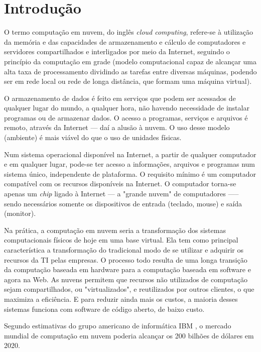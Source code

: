 \section{Introdução}

O termo computação em nuvem, do inglês \emph{cloud computing}, refere-se à
utilização da memória e das capacidades de armazenamento e cálculo de
computadores e servidores compartilhados e interligados por meio da Internet,
seguindo o princípio da computação em grade (modelo computacional capaz de
alcançar uma alta taxa de processamento dividindo as tarefas entre diversas
máquinas, podendo ser em rede local ou rede de longa distância, que formam uma
máquina virtual).

O armazenamento de dados é feito em serviços que podem ser acessados de qualquer
lugar do mundo, a qualquer hora, não havendo necessidade de instalar
programas ou de armazenar dados. O acesso a programas, serviços e arquivos é
remoto, através da Internet --- daí a alusão à nuvem. O uso desse modelo
(ambiente) é mais viável do que o uso de unidades físicas.

Num sistema operacional disponível na Internet, a partir de qualquer computador e em
qualquer lugar, pode-se ter acesso a informações, arquivos e programas num sistema
único, independente de plataforma. O requisito mínimo é um computador compatível
com os recursos disponíveis na Internet. O computador torna-se apenas um \emph{chip}
ligado à Internet — a "grande nuvem" de computadores —-- sendo necessários
somente os dispositivos de entrada (teclado, mouse) e saída (monitor).

Na prática, a computação em nuvem seria a transformação dos sistemas
computacionais físicos de hoje em uma base virtual. Ela tem como principal
característica a transformação do tradicional modo de se utilizar e adquirir os
recursos da TI pelas empresas. O processo todo resulta de uma longa transição da
computação baseada em hardware para a computação baseada em software e agora na
Web. As nuvens permitem que recursos não utilizados de computação sejam
compartilhados, ou "virtualizados", e reutilizados por outros clientes, o que
maximiza a eficiência. E para reduzir ainda mais os custos, a maioria desses
sistemas funciona com software de código aberto, de baixo custo.

Segundo estimativas do grupo americano de informática IBM \cite{IBM-cloud-computing},
o mercado mundial de computação em nuvem poderia alcançar os 200 bilhões de dólares
em 2020.
